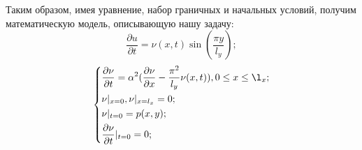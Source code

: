 {    
   Таким образом, имея уравнение, набор граничных и начальных условий, получим математическую модель, описывающую нашу задачу:
   		\begin{equation}
   		    \dfrac{\partial u}{\partial t} = \nu(x,t)\sin (\dfrac{\pi y}{l_y});
   		\end{equation}
        \begin{equation}\label{eq15}
            \left\{
			\begin{split}
			& \dfrac{\partial \nu}{\partial t} = \alpha^2(\dfrac{\partial \nu}{\partial x}
        - \dfrac{\pi^2}{l_y}\nu(x, t)), 0 \le x \le \l_x; \\
			 &\nu|_{x=0},   
    \nu|_{x=l_x} = 0;\\
            &  \nu|_{t=0} = p(x,y);\\        
        	& \dfrac{\partial \nu}{\partial t}|_{t=0} = 0;
			\end{split}
			\right.
        \end{equation}
}
\newpage
